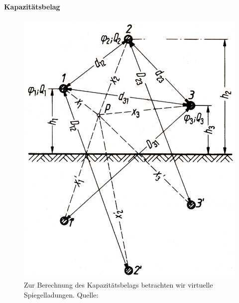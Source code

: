 \paragraph{Kapazitätsbelag}
\begin{figure}[tbhn]
\begin{center}
\noindent
\includegraphics[scale=1]{gespiegelterdrehstrom.png}
\end{center}
\caption{Zur Berechnung des Kapazitätsbelags betrachten wir virtuelle Spiegelladungen. Quelle: \cite{Flosdorff}}
\label{pic:gespiegelterdrehstrom} 
\end{figure}

